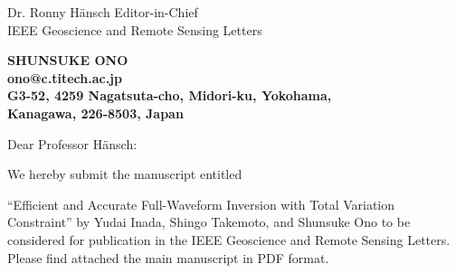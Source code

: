 \documentclass[11pt]{letter} %
\begin{document}
\signature{Shunsuke Ono}                  %
\longindentation=0pt                       %
\let\raggedleft\raggedright                %

\begin{letter}{Dr. Ronny Hänsch
Editor-in-Chief \\
IEEE Geoscience and Remote Sensing Letters
}

\begin{center}
\large\bf SHUNSUKE ONO \\
ono@c.titech.ac.jp\\
G3-52, 4259 Nagatsuta-cho, Midori-ku, Yokohama, \\Kanagawa, 226-8503, Japan
\end{center}
\vfill %



\opening{Dear Professor Hänsch:}
We hereby submit the manuscript entitled

``Efficient and Accurate Full-Waveform Inversion with Total Variation Constraint''
by Yudai Inada, Shingo Takemoto, and Shunsuke Ono to be considered for publication in
the IEEE Geoscience and Remote Sensing Letters.
Please find attached the main manuscript in PDF format.


\end{letter}
\end{document}
